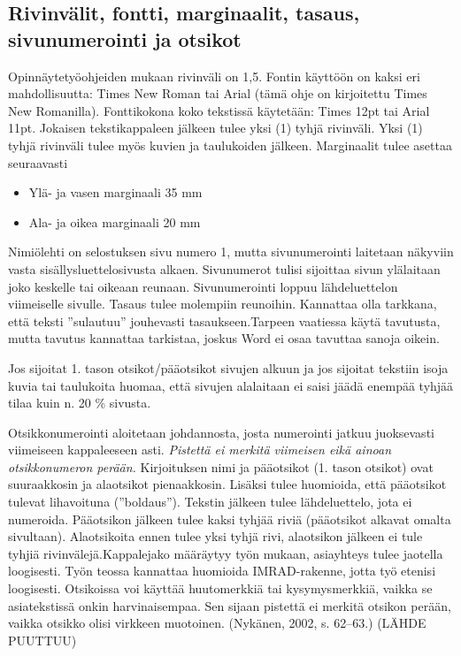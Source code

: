 \documentclass{LUT_pohja}[2016/03/09 LUT Dippa Pohja]
\begin{document}
\subsection{Rivinvälit, fontti, marginaalit, tasaus, sivunumerointi ja otsikot}
Opinnäytetyöohjeiden mukaan rivinväli on 1,5.  Fontin käyttöön on kaksi eri 
mahdollisuutta: Times New Roman tai Arial (tämä ohje on kirjoitettu Times New 
Romanilla). Fonttikokona koko tekstissä käytetään: Times 12pt tai Arial 11pt.  Jokaisen tekstikappaleen jälkeen tulee yksi (1) tyhjä rivinväli. Yksi (1) tyhjä rivinväli tulee myös kuvien ja taulukoiden jälkeen.
\newpage
Marginaalit tulee asettaa seuraavasti 
\begin{itemize}
\item Ylä- ja vasen marginaali 35 mm
\item Ala- ja oikea marginaali 20 mm
\end{itemize}
Nimiölehti on selostuksen sivu numero 1, mutta sivunumerointi laitetaan näkyviin vasta 
sisällysluettelosivusta alkaen. Sivunumerot tulisi sijoittaa sivun ylälaitaan joko keskelle tai oikeaan reunaan. Sivunumerointi loppuu lähdeluettelon viimeiselle sivulle. Tasaus tulee molempiin reunoihin. Kannattaa olla tarkkana, että teksti ”sulautuu” jouhevasti tasaukseen.Tarpeen vaatiessa käytä tavutusta, mutta tavutus kannattaa tarkistaa, joskus Word ei osaa tavuttaa sanoja oikein.\par

Jos sijoitat 1. tason otsikot/pääotsikot sivujen alkuun ja jos sijoitat tekstiin isoja kuvia tai taulukoita huomaa, että sivujen alalaitaan ei saisi jäädä enempää tyhjää tilaa kuin n. 20 \% sivusta.\citep[s. 16.]{Kauppinen01a} 

Otsikkonumerointi aloitetaan johdannosta, josta numerointi jatkuu juoksevasti viimeiseen kappaleeseen  asti. \textit{Pistettä ei merkitä viimeisen eikä ainoan otsikkonumeron perään.} Kirjoituksen nimi ja pääotsikot (1. tason otsikot) ovat suuraakkosin ja alaotsikot pienaakkosin. \citep[s. 34.]{Varis97} Lisäksi tulee huomioida, että pääotsikot tulevat lihavoituna (”boldaus”). Tekstin jälkeen tulee lähdeluettelo, jota ei numeroida. Pääotsikon jälkeen tulee kaksi tyhjää riviä (pääotsikot alkavat omalta sivultaan). Alaotsikoita ennen tulee yksi tyhjä rivi, alaotsikon jälkeen ei tule tyhjiä rivinvälejä.Kappalejako määräytyy työn mukaan, asiayhteys tulee jaotella loogisesti. Työn teossa kannattaa huomioida IMRAD-rakenne, jotta työ etenisi loogisesti. Otsikoissa voi käyttää huutomerkkiä tai kysymysmerkkiä, vaikka se asiatekstissä onkin harvinaisempaa. Sen sijaan pistettä ei merkitä otsikon perään, vaikka otsikko olisi virkkeen muotoinen. (Nykänen, 2002, s. 62–63.) (LÄHDE PUUTTUU)\par
\end{document}
